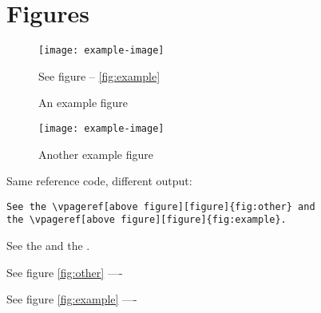 \documentclass[twoside]{book}
\begin{document}
\section{Figures}
\begin{figure}
\texttt{[image: example-image]}
\caption{An example figure}
See figure -- \vref*{fig:example}
\label{fig:example}
\end{figure}
\blindtext
\begin{figure}
\texttt{[image: example-image]}
\caption{Another example figure}
\label{fig:other}
\end{figure}
\newpage
Same reference code, different output:
\begin{verbatim}
See the \vpageref[above figure][figure]{fig:other} and
the \vpageref[above figure][figure]{fig:example}.
\end{verbatim}
See the  and
the .
\blindtext
\blindtext
\blindtext
\blindtext

See figure \vref*{fig:other} ----

See figure \vref*{fig:example} ----
\end{document}
